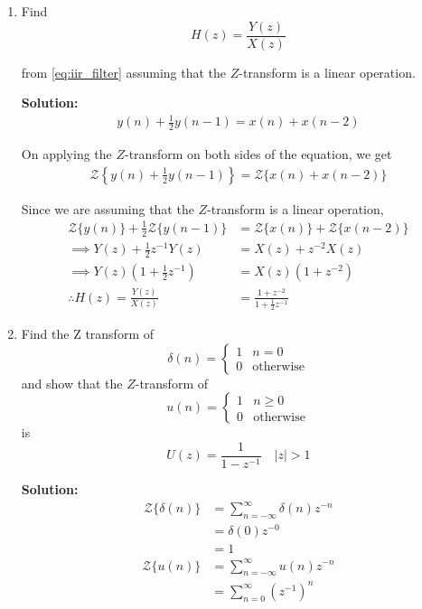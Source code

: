 \documentclass[journal,12pt,twocolumn]{IEEEtran}
\newcommand{\solution}{\noindent \textbf{Solution: }}
\providecommand{\brak}[1]{\ensuremath{\left(#1\right)}}
\providecommand{\cbrak}[1]{\ensuremath{\left\{#1\right\}}}
\providecommand{\abs}[1]{\left\vert#1\right\vert}
\providecommand{\z}[1]{{\mathcal{Z}}\{#1\}}
\numberwithin{equation}{section}
\renewcommand\thesection{\arabic{section}}
\begin{document}
\begin{enumerate}[label=\thesection.\arabic*]
	\item Find
	\begin{equation}
		H(z) = \frac{Y(z)}{X(z)}
	\end{equation}

	from  \eqref{eq:iir_filter} assuming that the $Z$-transform is a linear operation.

	\solution 
	\begin{align}
		y(n) + \frac{1}{2}y(n-1) = x(n) + x(n-2)
	\end{align}
	
	On applying the $Z$-transform on both sides of the equation, we get
	\begin{align}
		{\mathcal {Z}}\cbrak{y(n) + \frac{1}{2}y(n-1)} = {\mathcal {Z}}\{x(n) + x(n-2)\}
	\end{align}
	
	Since we are assuming that the $Z$-transform is a linear operation,
	\begin{align}
		\z{y(n)} + \frac12 \z{y(n-1)} &= \z{x(n)} + \z{x(n-2)} \\
		\implies Y(z) + \frac12 z^{-1} Y(z) &= X(z) + z^{-2} X(z) \\
		\implies Y(z) \brak{1 + \frac12 z^{-1}} &= X(z) (1 + z^{-2}) \\
		\therefore H(z) = \frac{Y(z)}{X(z)} &= \frac{1 + z^{-2}}{1 + \frac12 z^{-1}} \label{eq:freq_resp}
	\end{align}
	
	\item Find the Z transform of 
	\begin{equation}
		\delta(n) =
		\begin{cases}
			1 & n = 0 \\
			0 & \text{otherwise}
		\end{cases}
	\end{equation}
	and show that the $Z$-transform of
	\begin{equation}
	\label{eq:unit_step}
	u(n) =
	\begin{cases}
		1 & n \ge 0 \\
		0 & \text{otherwise}	
	\end{cases}
	\end{equation}
	is
	\begin{equation}
		U(z) = \frac{1}{1-z^{-1}} \quad \abs{z} > 1
	\end{equation}
	
	\solution 
	\begin{align}
		\z{\delta(n)} &= \sum _{n=-\infty }^{\infty }\delta(n)z^{-n} \\
		&= \delta(0) z^{-0} \\
		&= 1 
	\end{align}
	\begin{align}
		\z{u(n)} &= \sum _{n=-\infty }^{\infty } u(n)z^{-n} \\
		&= \sum _{n=0}^{\infty } \brak{z^{-1}}^n 
	\end{align}
	

\end{enumerate}
\end{document}
